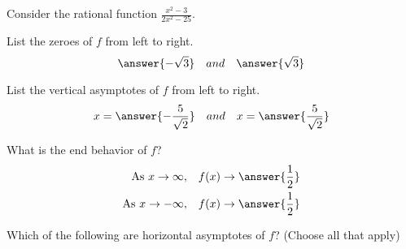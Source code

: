 \documentclass{ximera}
\author{Bobby Ramsey}
\begin{document}
Consider the rational function $\displaystyle \frac{x^2-3}{2x^2-25}$.

\begin{exercise}
	List the zeroes of $f$ from left to right.
	\[ \answer{-\sqrt{3}} \quad and \quad \answer{\sqrt{3}} \]
\end{exercise}

\begin{exercise}
	List the vertical asymptotes of $f$ from left to right.	
	\[ x = \answer{-\frac{5}{\sqrt{2}}} \quad and \quad x=\answer{\frac{5}{\sqrt{2}}} \]
\end{exercise}	
	
\begin{exercise}
	What is the end behavior of $f$?
	\begin{align*}
		\text{As} \,\, x \to \infty, &\quad f(x) \to \answer{\frac{1}{2}}\\
		\text{As} \,\, x \to -\infty, &\quad f(x) \to \answer{\frac{1}{2}}\\
	\end{align*}	
\end{exercise}	
	
\begin{exercise}
	Which of the following are horizontal asymptotes of $f$? (Choose all that apply)
	\begin{selectAll}
	\end{selectAll}	
\end{exercise}	
	
\end{document}
